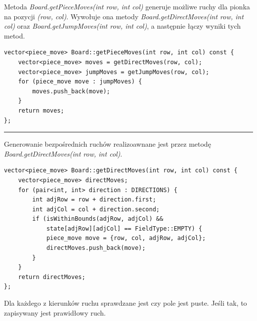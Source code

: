 \documentclass[a4paper, 12pt]{article}
\begin{document}
Metoda \textit{Board.getPieceMoves(int row, int col)} 
generuje możliwe ruchy dla pionka na pozycji \textit{(row, col)}.
Wywołuje ona metody \textit{Board.getDirectMoves(int row, int col)} oraz
\textit{Board.getJumpMoves(int row, int col)}, a następnie 
łączy wyniki tych metod.
\begin{lstlisting}
vector<piece_move> Board::getPieceMoves(int row, int col) const {
    vector<piece_move> moves = getDirectMoves(row, col);
    vector<piece_move> jumpMoves = getJumpMoves(row, col);
    for (piece_move move : jumpMoves) {
        moves.push_back(move);
    }
    return moves;
};
\end{lstlisting}
\vspace{0.5cm}
\hrule
\vspace{1cm}

Generowanie bezpośrednich ruchów realizoawnane jest przez metodę
\textit{Board.getDirectMoves(int row, int col)}.
\begin{lstlisting}
vector<piece_move> Board::getDirectMoves(int row, int col) const {
    vector<piece_move> directMoves;
    for (pair<int, int> direction : DIRECTIONS) {
        int adjRow = row + direction.first;
        int adjCol = col + direction.second;
        if (isWithinBounds(adjRow, adjCol) &&
            state[adjRow][adjCol] == FieldType::EMPTY) {
            piece_move move = {row, col, adjRow, adjCol};
            directMoves.push_back(move);
        }
    }
    return directMoves;
};
\end{lstlisting}
Dla każdego z kierunków ruchu sprawdzane jest czy pole jest puste.
Jeśli tak, to zapisywany jest prawidłowy ruch.
\end{document}
